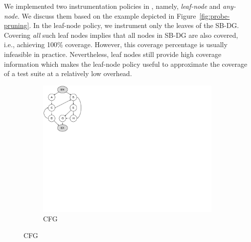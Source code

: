 {We implemented two instrumentation policies in {\bcov}, namely, \textit{leaf-node} and \textit{any-node}.
We discuss them based on the example depicted in Figure~\ref{fig:probe-pruning}.
In the leaf-node policy, we instrument only the leaves of the SB-DG.
Covering \textit{all} such leaf nodes implies that all nodes in SB-DG are also covered, i.e., achieving 100\% coverage.
However, this coverage percentage is usually infeasible in practice.
Nevertheless, leaf nodes still provide high coverage information which makes the leaf-node policy useful to approximate the coverage of a test suite at a relatively low overhead. 



\begin{figure}[t!]
    \centering
    \begin{subfigure}[t]{0.17\textwidth}
        \includegraphics[clip, trim=0.1cm 12.1cm 19.6cm 0.1cm, width=\textwidth]{fig/bcov-03-probe-prunning}
        \caption{\small CFG}
        \label{fig:3:cfg}
    \end{subfigure}

\end{figure}}

